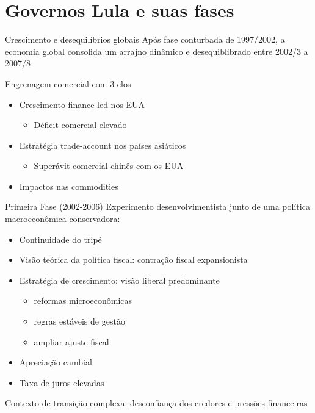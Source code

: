 \documentclass[presentation]{beamer}
\begin{document}
\section{Governos Lula e suas fases}
\label{sec:org723fde5}

\begin{frame}[label={sec:orgb5d1cc2}]{Crescimento e desequilíbrios globais \cite{carneiroSupremaciaDosMercados2006}}
Após fase conturbada de 1997/2002, a economia global consolida um arrajno dinâmico e desequiblibrado entre 2002/3 a 2007/8

\alert{Engrenagem comercial com 3 elos}
\begin{itemize}
\item Crescimento finance-led nos EUA
\begin{itemize}
\item Déficit comercial elevado
\end{itemize}
\item Estratégia trade-account nos países asiáticos
\begin{itemize}
\item Superávit comercial chinês com os EUA
\end{itemize}
\item Impactos nas commodities
\end{itemize}
\end{frame}

\begin{frame}[label={sec:orgbae79f2}]{Primeira Fase (2002-2006)}
Experimento desenvolvimentista junto de uma política macroeconômica conservadora:
\begin{itemize}
\item Continuidade do tripé
\item Visão teórica da \alert{política fiscal:} contração fiscal expansionista
\item \alert{Estratégia de crescimento:} visão liberal predominante
\begin{itemize}
\item reformas microeconômicas
\item regras estáveis de gestão
\item ampliar ajuste fiscal
\end{itemize}
\item Apreciação cambial
\item Taxa de juros elevadas
\end{itemize}

\alert{Contexto de transição complexa:} desconfiança dos credores e pressões financeiras
\end{frame}
\end{document}
